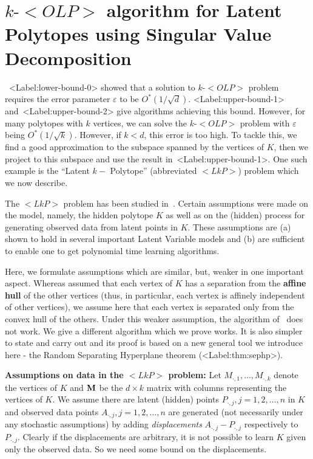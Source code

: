 \documentclass[11pt,letterpaper]{article}
\newcounter{note}[section]
\def\mathsf#1{<#1>}%
\def\xspace{}%
\def\Cref#1{<Label:#1>}%
\theoremstyle{definition}
\theoremstyle{remark}
\newcommand{\bM}{{\bf M}}
\newcommand{\lkp}{{\mathsf {LkP}}\xspace}
\newcommand{\olp}{{\mathsf {OLP}}\xspace}
\newcommand{\kolp}{k\mbox{-}\olp}
\newcommand{\Mdot}[1]{{M_{\cdot, #1}}}
\begin{document}

\section{$\kolp$ algorithm for Latent Polytopes using Singular Value Decomposition}
\label{sec:lkp}

~\Cref{lower-bound-0} showed that a solution to $\kolp$ problem requires the error parameter $\varepsilon$ to be $O^*(1/\sqrt{d})$. \Cref{upper-bound-1} and~\Cref{upper-bound-2} give algorithms achieving this bound. However, for many polytopes with $k$ vertices, we can solve the $\kolp$ problem with $\varepsilon$ being $O^*(1/\sqrt{k})$. However, if $k<d$, this error is too high. To tackle this, we find a good approximation to the subspace spanned by the vertices of $K$, 
then we project to this subspace and use the result in~\Cref{upper-bound-1}. 
One such example is the ``Latent $k-$ Polytope'' (abbreviated $\lkp$) problem which we now describe.

The $\lkp$ problem has been studied in~\cite{BhattacharyyaK20}. Certain assumptions were made on the model, namely, the hidden polytope $K$ as well as on the (hidden) process for generating observed data from latent points in $K$. These assumptions are (a) shown to hold in several important Latent Variable models and (b) are sufficient to enable one to get polynomial time learning algorithms.

Here, we formulate assumptions which are similar, but, weaker in one important aspect. Whereas \cite{BhattacharyyaK20} assumed that each vertex of $K$ has a separation from the {\bf affine hull} of the other vertices (thus, in particular, each vertex is affinely independent of other vertices), we assume here that each vertex is separated only from the convex hull of the others. Under this weaker assumption, the algorithm of~\cite{BhattacharyyaK20} does not work. We give a different algorithm which we prove works. It is also simpler to state and carry out and its proof is based on a new general tool we introduce here - the Random Separating Hyperplane theorem (\Cref{thm:sephp}).  

\noindent
{\bf Assumptions on data in the $\lkp$ problem:} 
Let $\Mdot{1}, \ldots, \Mdot{k}$ denote the vertices of $K$ and $\bM$ be the $d \times k$ matrix with columns representing the vertices of $K$.  
We assume there are latent (hidden) points $P_{\cdot ,j}, j=1,2,\ldots ,n$ in $K$ and observed data points $A_{\cdot,j}, j=1,2,\ldots ,n$ are generated (not necessarily under any stochastic assumptions) by adding {\it displacements} $A_{\cdot,j}-P_{\cdot,j}$ respectively to $P_{\cdot,j}$. Clearly if the displacements are arbitrary, it is not possible to learn $K$ given only the observed data. So we need some bound on the displacements. 
\end{document}
